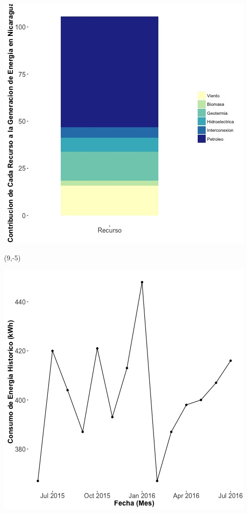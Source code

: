 \documentclass{article}\usepackage[]{graphicx}\usepackage[]{color}
\newenvironment{knitrout}{}{} %
\begin{document}
\begin{knitrout}
\color{fgcolor}
\includegraphics[scale=0.65]{figure/gridplot2.jpg} 
\end{knitrout}

 \begin{textblock}{1}(9,-5)
\begin{minipage}{20em}
\begingroup

\endgroup
\end{minipage}
\end{textblock}

\begin{knitrout}
\color{fgcolor}
\includegraphics[scale=0.65]{figure/A24_historico_energia} 
\end{knitrout}
\end{document}

